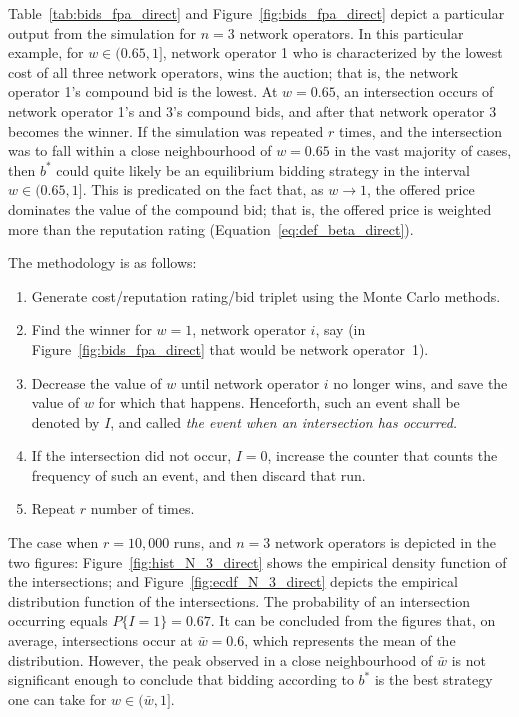 Table~\ref{tab:bids_fpa_direct} and Figure~\ref{fig:bids_fpa_direct} depict a particular output from the simulation for $n=3$ network operators. In this particular example, for $w\in (0.65, 1]$, network operator 1 who is characterized by the lowest cost of all three network operators, wins the auction; that is, the network operator 1's compound bid is the lowest. At $w=0.65$, an intersection occurs of network operator 1's and 3's compound bids, and after that network operator 3 becomes the winner. If the simulation was repeated $r$ times, and the intersection was to fall within a close neighbourhood of $w=0.65$ in the vast majority of cases, then $b^*$ could quite likely be an equilibrium bidding strategy in the interval $w\in (0.65, 1]$. This is predicated on the fact that, as $w\rightarrow 1$, the offered price dominates the value of the compound bid; that is, the offered price is weighted more than the reputation rating (Equation~\eqref{eq:def_beta_direct}).

The methodology is as follows:
\begin{enumerate}
	\item Generate cost/reputation rating/bid triplet using the Monte Carlo methods.
	\item Find the winner for $w=1$, network operator $i$, say (in Figure~\ref{fig:bids_fpa_direct} that would be network operator~1).
	\item Decrease the value of $w$ until network operator $i$ no longer wins, and save the value of $w$ for which that happens. Henceforth, such an event shall be denoted by $I$, and called \emph{the event when an intersection has occurred.}
	\item If the intersection did not occur, $I=0$, increase the counter that counts the frequency of such an event, and then discard that run.
	\item Repeat $r$ number of times.
\end{enumerate}

The case when $r=10,000$ runs, and $n=3$ network operators is depicted in the two figures: Figure~\ref{fig:hist_N_3_direct} shows the empirical density function of the intersections; and Figure~\ref{fig:ecdf_N_3_direct} depicts the empirical distribution function of the intersections. The probability of an intersection occurring equals $P\{I=1\} = 0.67$. It can be concluded from the figures that, on average, intersections occur at $\bar{w}=0.6$, which represents the mean of the distribution. However, the peak observed in a close neighbourhood of $\bar{w}$ is not significant enough to conclude that bidding according to $b^*$ is the best strategy one can take for $w\in (\bar{w},1]$.

